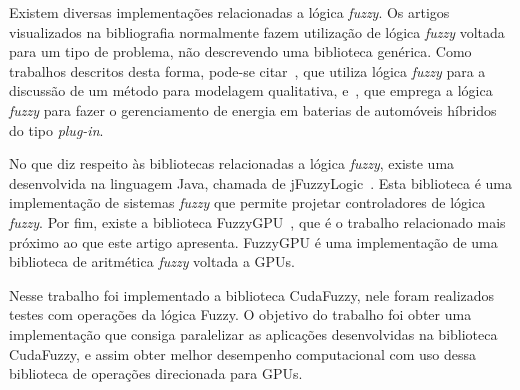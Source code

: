 \documentclass[12pt]{article}
\begin{document}
	Existem diversas implementações relacionadas a lógica \textit{fuzzy}. Os artigos visualizados na bibliografia normalmente fazem utilização de lógica \textit{fuzzy} voltada para um tipo de problema, não descrevendo uma biblioteca genérica. Como trabalhos descritos desta forma, pode-se citar~\cite{sugeno:93}, que utiliza lógica \textit{fuzzy} para a discussão de um método para modelagem qualitativa, e~\cite{li:11}, que emprega a lógica \textit{fuzzy} para fazer o gerenciamento de energia em baterias de automóveis híbridos do tipo \textit{plug-in}.
	
	No que diz respeito às bibliotecas relacionadas a lógica \textit{fuzzy}, existe uma desenvolvida na linguagem Java, chamada de jFuzzyLogic~\cite{cingolani:12, cingolani:13}. Esta biblioteca é uma implementação de sistemas \textit{fuzzy} que permite projetar controladores de lógica \textit{fuzzy}. Por fim, existe a biblioteca FuzzyGPU~\cite{defour:14}, que é o trabalho relacionado mais próximo ao que este artigo apresenta. FuzzyGPU é uma implementação de uma biblioteca de aritmética \textit{fuzzy} voltada a GPUs.
	
	Nesse trabalho foi implementado a biblioteca CudaFuzzy, nele foram realizados testes com operações da lógica Fuzzy. O objetivo do trabalho foi obter uma implementação que consiga paralelizar as aplicações desenvolvidas na biblioteca CudaFuzzy, e assim obter melhor desempenho computacional com uso dessa biblioteca de operações direcionada para GPUs. 
	



\end{document}
